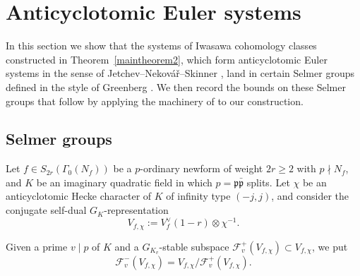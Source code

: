 \documentclass[10pt,letterpaper]{amsart}
\theoremstyle{plain}
\theoremstyle{definition}
\theoremstyle{definition}
\theoremstyle{plain}
\theoremstyle{plain}
\theoremstyle{plain}
\theoremstyle{remark}
\numberwithin{equation}{section}
\newcommand{\pp}{\mathfrak{p}}
\newcommand{\ppbar}{\bar{\mathfrak{p}}}
\newcommand{\Q}{\mathbf{Q}}
\newcommand{\Z}{\mathbf{Z}}
\begin{document}
\section{Anticyclotomic Euler systems}\label{anticycltomicES}

In this section we show that the systems of Iwasawa cohomology classes constructed in Theorem~\ref{maintheorem2}, which form anticyclotomic Euler systems in the sense of Jetchev--Nekov\'a{\v r}--Skinner \cite{JNS}, land in certain Selmer groups defined in the style of Greenberg \cite{Greenberg55}. We then record the bounds on these Selmer groups that follow by applying the machinery of \cite{JNS}  to our construction.



\subsection{Selmer groups}

Let $f\in S_{2r}(\Gamma_0(N_f))$ be a $p$-ordinary newform of weight $2r\geq 2$ with $p\nmid N_f$, and $K$ be an imaginary quadratic field in which $p=\pp\ppbar$ splits. Let $\chi$ be an anticyclotomic Hecke character of $K$ of infinity type $(-j,j)$, and consider the conjugate self-dual $G_K$-representation 
\[
V_{f,\chi}:=V_f^\vee(1-r)\otimes\chi^{-1}.
\]

Given a prime $v\mid p$ of $K$ and a $G_{K_v}$-stable subspace $\mathscr{F}_v^+(V_{f,\chi})\subset V_{f,\chi}$, we put 
\[\mathscr{F}_v^-(V_{f,\chi})=V_{f,\chi}/\mathscr{F}_v^+(V_{f,\chi}).\]
\end{document}
